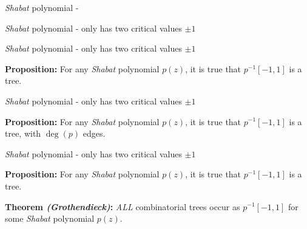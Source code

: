 \documentclass{beamer}
\begin{document}
\begin{frame}

{\it Shabat} polynomial - 

\end{frame}


\begin{frame}

{\it Shabat} polynomial - only has two critical values $\pm 1$

\end{frame}



\begin{frame}

{\it Shabat} polynomial - only has two critical values $\pm 1$

\vspace{5mm}

{\bf Proposition:} For any {\it Shabat} polynomial $p(z)$, it is true that $p^{-1}[-1,1]$ is a tree.

\end{frame}




\begin{frame}

{\it Shabat} polynomial - only has two critical values $\pm 1$

\vspace{5mm}

{\bf Proposition:} For any {\it Shabat} polynomial $p(z)$, it is true that $p^{-1}[-1,1]$ is a tree, with $\deg(p)$ edges.

\end{frame}





\begin{frame}

{\it Shabat} polynomial - only has two critical values $\pm 1$

\vspace{5mm}

{\bf Proposition:} For any {\it Shabat} polynomial $p(z)$, it is true that $p^{-1}[-1,1]$ is a tree.

\vspace{5mm} 

{\bf Theorem {\it (Grothendieck)}:} {\it ALL} combinatorial trees occur as $p^{-1}[-1,1]$ for some {\it Shabat} polynomial $p(z)$.

\vspace{5mm}

\end{frame}
\end{document}
